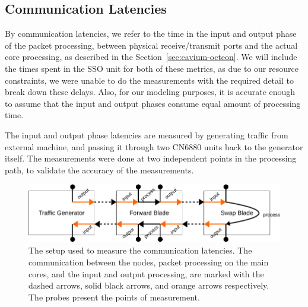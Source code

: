 


\subsection{Communication Latencies}
\label{sec:communication-latencies}

By communication latencies, we refer to the time in the input and output phase of the packet processing, between physical receive/transmit ports and the actual core processing, as described in the Section~\ref{sec:cavium-octeon}. We will include the times spent in the SSO unit for both of these metrics, as due to our resource constraints, we were unable to do the measurements with the required detail to break down these delays. Also, for our modeling purposes, it is accurate enough to assume that the input and output phases consume equal amount of processing time.

The input and output phase latencies are measured by generating traffic from external machine, and passing it through two CN6880 units back to the generator itself. The measurements were done at two independent points in the processing path, to validate the accuracy of the measurements.

\begin{figure}[]
  \begin{center}
    \includegraphics[width=\textwidth]{images/comm-measurement-setup.pdf}
    \caption{The setup used to measure the communication latencies. The communication between the nodes, packet processing on the main cores, and the input and output processing, are marked with the dashed arrows, solid black arrows, and orange arrows respectively. The probes present the points of measurement.}
    \label{fig:comm-setup}
  \end{center}
\end{figure}


